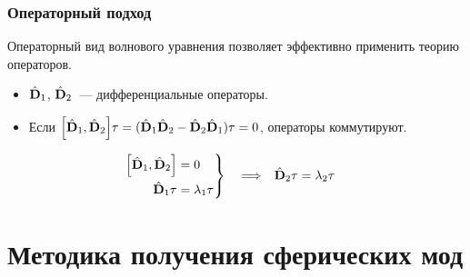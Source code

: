 \documentclass[compress]{beamer}
\begin{document}

    \begin{frame}\frametitle{Операторный подход}

        Операторный вид волнового уравнения позволяет эффективно применить теорию операторов.

        \begin{itemize}

            \item $\hat{\mathbf{D}}_1$, $\hat{\mathbf{D}}_2$~--- дифференциальные операторы.

            \item Если $\qty[\hat{\mathbf{D}}_1, \hat{\mathbf{D}}_2] \tau = (\hat{\mathbf{D}}_1\hat{\mathbf{D}}_2 - \hat{\mathbf{D}}_2\hat{\mathbf{D}}_1) \tau = 0$, операторы коммутируют.

        \end{itemize}

        \begin{align*}
            \left. \begin{aligned}
                \qty[\hat{\mathbf{D}}_1, \hat{\mathbf{D}}_2] &= 0 \\
                \hat{\mathbf{D}}_1 \tau &= \lambda_1 \tau
            \end{aligned} \right\}
            \quad \Longrightarrow \quad &
            \hat{\mathbf{D}}_2 \tau = \lambda_2 \tau
        \end{align*}

    \end{frame}


    \section[Методика]{Методика получения сферических мод}

\end{document}
